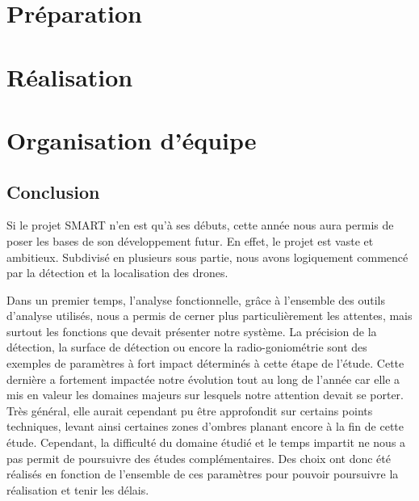 \documentclass[a4paper, 11pt, oneside, oldfontcommands]{memoir}
\newcounter{rem}[chapter]
\begin{document}
% 
% 
% 
% 
% 

%
%


\part{Préparation}




\part{Réalisation}







\part{Organisation d'équipe}






\chapter*{Conclusion}

Si le projet SMART n'en est qu'à ses débuts, cette année nous aura permis de poser les bases de son développement futur. En effet, le projet est vaste et ambitieux. Subdivisé en plusieurs sous partie, nous avons logiquement commencé par la détection et la localisation des drones.

Dans un premier temps, l'analyse fonctionnelle, grâce à l'ensemble des outils d'analyse utilisés, nous a permis de cerner plus particulièrement les attentes, mais surtout les fonctions que devait présenter notre système. La précision de la détection, la surface de détection ou encore la radio-goniométrie sont des exemples de paramètres à fort impact déterminés à cette étape de l'étude. Cette dernière a fortement impactée notre évolution tout au long de l'année car elle a mis en valeur les domaines majeurs sur lesquels notre attention devait se porter. Très général, elle aurait cependant pu être approfondit sur certains points techniques, levant ainsi certaines zones d'ombres planant encore à la fin de cette étude. Cependant, la difficulté du domaine étudié et le temps impartit ne nous a pas permit de poursuivre des études complémentaires. Des choix ont donc été réalisés en fonction de l'ensemble de ces paramètres pour pouvoir poursuivre la réalisation et tenir les délais.
\end{document}
